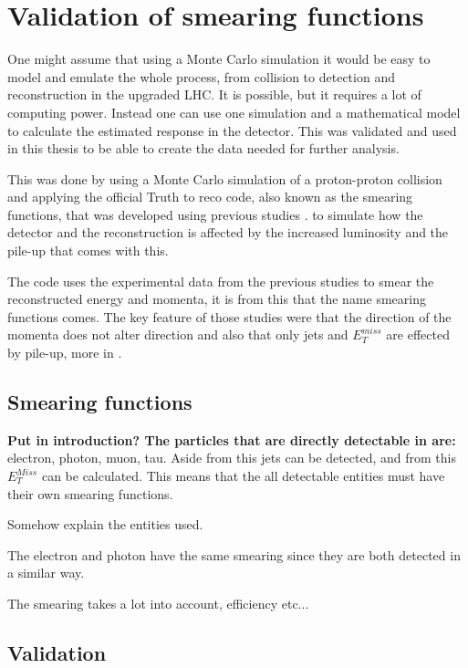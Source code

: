 \chapter{Validation of smearing functions}\label{cha:vali}
One might assume that using a Monte Carlo simulation it would be easy to model and emulate the whole process, from collision to detection and reconstruction in the upgraded LHC. It is possible, but it requires a lot of computing power. Instead one can use one simulation and a mathematical model to calculate the estimated response in the detector. This was validated and used in this thesis to be able to create the data needed for further analysis. 

This was done by using a Monte Carlo simulation of a proton-proton collision and applying the official Truth to reco code, also known as the smearing functions, that was developed using previous studies \citep{ATLAS:LOI2, ATL-PHYS-PUB-2013-004}. to simulate how the detector and the reconstruction is affected by the increased luminosity and the pile-up that comes with this.

The code uses the experimental data from the previous studies to smear the reconstructed energy and momenta, it is from this that the name smearing functions comes.
The key feature of those studies were that the direction of the momenta does not alter direction and also that only jets and $E^{miss}_T$ are effected by pile-up, more in .

\newpage
\section{Smearing functions}\label{sec:smear}
\textbf{Put in introduction? The particles that are directly detectable in \abbrATLAS are:} electron, photon, muon, tau. Aside from this jets can be detected, and from this $E_T^{Miss}$ can be calculated. This means that the all detectable entities must have their own smearing functions.

Somehow explain the entities used. 

The electron and photon have the same smearing since they are both detected in a similar way. 

The smearing takes a lot into account, efficiency etc...

\section{Validation}\label{sec:vali}
